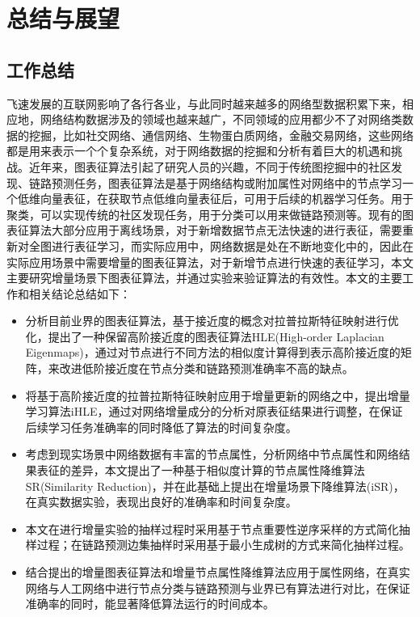 \chapter{总结与展望}

\section{工作总结}
飞速发展的互联网影响了各行各业，与此同时越来越多的网络型数据积累下来，相应地，网络结构数据涉及的领域也越来越广，不同领域的应用都少不了对网络类数据的挖掘，比如社交网络、通信网络、生物蛋白质网络，金融交易网络，这些网络都是用来表示一个个复杂系统，对于网络数据的挖掘和分析有着巨大的机遇和挑战。近年来，图表征算法引起了研究人员的兴趣，不同于传统图挖掘中的社区发现、链路预测任务，图表征算法是基于网络结构或附加属性对网络中的节点学习一个低维向量表征，在获取节点低维向量表征后，可用于后续的机器学习任务。用于聚类，可以实现传统的社区发现任务，用于分类可以用来做链路预测等。现有的图表征算法大部分应用于离线场景，对于新增数据节点无法快速的进行表征，需要重新对全图进行表征学习，而实际应用中，网络数据是处在不断地变化中的，因此在实际应用场景中需要增量的图表征算法，对于新增节点进行快速的表征学习，本文主要研究增量场景下图表征算法，并通过实验来验证算法的有效性。本文的主要工作和相关结论总结如下：
\begin{itemize}
	\item 分析目前业界的图表征算法，基于接近度的概念对拉普拉斯特征映射进行优化，提出了一种保留高阶接近度的图表征算法HLE(High-order Laplacian Eigenmaps)，通过对节点进行不同方法的相似度计算得到表示高阶接近度的矩阵，来改进低阶接近度在节点分类和链路预测准确率不高的缺点。
	\item 将基于高阶接近度的拉普拉斯特征映射应用于增量更新的网络之中，提出增量学习算法iHLE，通过对网络增量成分的分析对原表征结果进行调整，在保证后续学习任务准确率的同时降低了算法的时间复杂度。
	\item 考虑到现实场景中网络数据有丰富的节点属性，分析网络中节点属性和网络结果表征的差异，本文提出了一种基于相似度计算的节点属性降维算法SR(Similarity Reduction)，并在此基础上提出在增量场景下降维算法(iSR)，在真实数据实验，表现出良好的准确率和时间复杂度。		
	\item 本文在进行增量实验的抽样过程时采用基于节点重要性逆序采样的方式简化抽样过程；在链路预测边集抽样时采用基于最小生成树的方式来简化抽样过程。
	\item 结合提出的增量图表征算法和增量节点属性降维算法应用于属性网络，在真实网络与人工网络中进行节点分类与链路预测与业界已有算法进行对比，在保证准确率的同时，能显著降低算法运行的时间成本。

\end{itemize}
